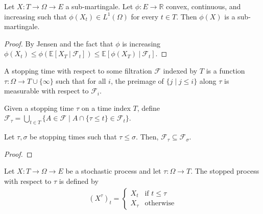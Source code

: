 \begin{lemma}\label{lem:convex_of_submg_is_submg}
  \leanok
Let $X : T  \rightarrow \Omega \rightarrow E$ a sub-martingale.
Let $\phi:E \rightarrow \mathbb{R}$ convex, continuous, and increasing such that
$\phi(X_t)\in L^1(\Omega)$ for every $t\in T$. Then $\phi(X)$ is a sub-martingale.
\end{lemma}

\begin{proof}
  \leanok
  By Jensen and the fact that $\phi$ is increasing
  $\phi(X_t) \leq \phi\left( \mathbb{E}[X_T\ |\ \mathcal{F}_t] \right)\leq \mathbb{E}[\phi(X_T)\ |\ \mathcal{F}_t]$.
\end{proof}


\begin{definition}\label{def:IsStoppingTime}
  \mathlibok
A stopping time with respect to some filtration $\mathcal{F}$ indexed by $T$ is a function $\tau : \Omega \to T \cup \{\infty\}$ such that for all $i$, the preimage of $\{j \mid j \le i\}$ along $\tau$ is measurable with respect to $\mathcal{F}_i$.
\end{definition}


\begin{definition}\label{def:StoppingTimeGen}
  \mathlibok
  Given a stopping time $\tau$ on a time index $T$, define
  $\mathcal{F}_\tau = \bigcup_{t \in T} \{A \in \mathcal{F} \mid A \cap \{\tau \le t\} \in \mathcal{F}_t\}.$
\end{definition}


\begin{lemma}\label{lem:StoppingTimeGenMono}
  \mathlibok
  Let $\tau, \sigma$ be stopping times such that $\tau \le \sigma$.
  Then, $\mathcal{F}_\tau \subseteq \mathcal{F}_\sigma$.
\end{lemma}

\begin{proof}\leanok

\end{proof}


\begin{definition}\label{def:stoppedProcess}
  \mathlibok
Let $X : T \to \Omega \to E$ be a stochastic process and let $\tau : \Omega \to T$.
The stopped process with respect to $\tau$ is defined by
\begin{align*}
  (X^{\tau})_t = \begin{cases}
    X_t & \text{if } t \le \tau \\
    X_{\tau} & \text{otherwise}
  \end{cases}
\end{align*}
\end{definition}



